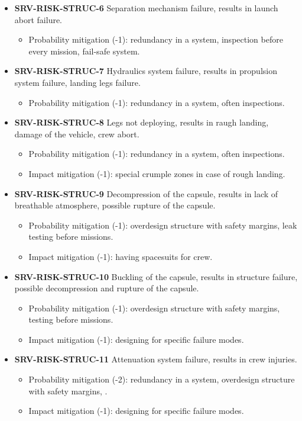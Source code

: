 \begin{itemize}
	 \item \textbf{SRV-RISK-STRUC-6} Separation mechanism failure, results in launch abort failure.
	\begin{itemize}
		 \item Probability mitigation (-1): redundancy in a system, inspection before every mission, fail-safe system.	\end{itemize}
	 \item \textbf{SRV-RISK-STRUC-7} Hydraulics system failure, results in propulsion system failure, landing legs failure.
	\begin{itemize}
		 \item Probability mitigation (-1): redundancy in a system, often inspections.	\end{itemize}
	 \item \textbf{SRV-RISK-STRUC-8} Legs not deploying, results in raugh landing, damage of the vehicle, crew abort.
	\begin{itemize}
		 \item Probability mitigation (-1): redundancy in a system, often inspections.		 \item Impact mitigation (-1): special crumple zones in case of rough landing.	\end{itemize}
	 \item \textbf{SRV-RISK-STRUC-9} Decompression of the capsule, results in lack of breathable atmosphere, possible rupture of the capsule.
	\begin{itemize}
		 \item Probability mitigation (-1): overdesign structure with safety margins, leak testing before missions.		 \item Impact mitigation (-1): having spacesuits for crew.	\end{itemize}
	 \item \textbf{SRV-RISK-STRUC-10} Buckling of the capsule, results in structure failure, possible decompression and rupture of the capsule.
	\begin{itemize}
		 \item Probability mitigation (-1): overdesign structure with safety margins, testing before missions.		 \item Impact mitigation (-1): designing for specific failure modes.	\end{itemize}
	 \item \textbf{SRV-RISK-STRUC-11} Attenuation system failure, results in crew injuries.
	\begin{itemize}
		 \item Probability mitigation (-2): redundancy in a system, overdesign structure with safety margins, .		 \item Impact mitigation (-1): designing for specific failure modes.	\end{itemize}

\end{itemize}
